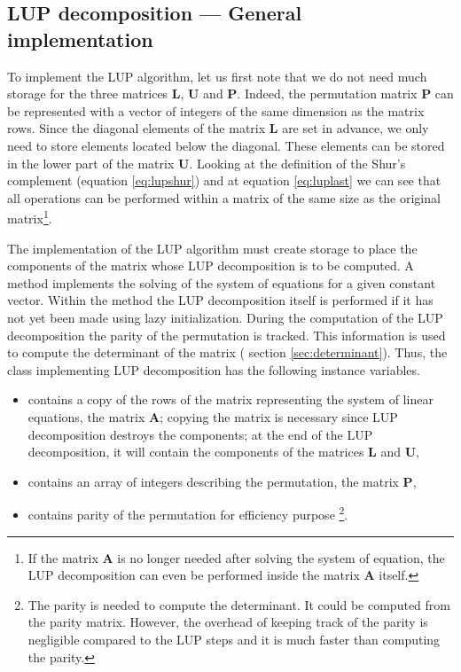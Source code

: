 \subsection{LUP decomposition --- General implementation}
To implement the LUP algorithm, let us
first note that we do not need much storage for the three matrices
$\textbf{L}$, $\textbf{U}$ and $\textbf{P}$. Indeed, the permutation matrix
$\textbf{P}$ can be represented with a vector of integers of the same
dimension as the matrix rows. Since the diagonal elements of the
matrix $\textbf{L}$ are set in advance, we only need to store
elements located below the diagonal. These elements can be stored
in the lower part of the matrix $\textbf{U}$. Looking at the
definition of the Shur's complement (equation \ref{eq:lupshur})
and at equation \ref{eq:luplast} we can see that all operations
can be performed within a matrix of the same size as the original
matrix\footnote{If the matrix $\textbf{A}$ is no longer needed after
solving the system of equation, the LUP decomposition can even be
performed inside the matrix $\textbf{A}$ itself.}.

The implementation of the LUP algorithm must create storage to
place the components of the matrix whose LUP decomposition is to
be computed. A method implements the solving of the system of
equations for a given constant vector. Within the method the LUP
decomposition itself is performed if it has not yet been made
using lazy initialization. During the computation of the LUP
decomposition the parity of the permutation is tracked. This
information is used to compute the determinant of the matrix (\cf
section \ref{sec:determinant}). Thus, the class implementing LUP
decomposition has the following instance variables.
\begin{itemize}
\item {} contains a copy of the rows of the matrix
representing the system of linear equations, \ie the matrix $\textbf{A}$; copying the matrix is necessary since LUP decomposition
destroys the components; at the end of the LUP decomposition, it
will contain the components of the matrices $\textbf{L}$ and $\textbf{U}$,
\item {} contains an array of integers describing the permutation,
\ie the matrix $\textbf{P}$,
\item {} contains parity of the permutation for efficiency purpose
\footnote{The parity is needed to compute the determinant. It
could be computed from the parity matrix. However, the overhead of
keeping track of the parity is negligible compared to the LUP
steps and it is much faster than computing the parity.}.
\end{itemize}

